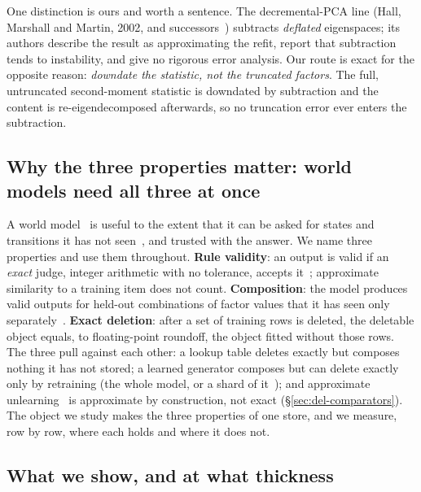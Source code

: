 \documentclass{article} %
\begin{document}
One distinction is ours and worth a sentence. The decremental-PCA line
(Hall, Marshall and Martin, 2002\nocite{hall2002adding}, and successors~\citep{jin2014evd,lee2021fast}) subtracts \emph{deflated} eigenspaces; its
authors describe the result as approximating the refit, report that subtraction tends to
instability, and give no rigorous error analysis. Our route is exact for the opposite reason:
\emph{downdate the statistic, not the truncated factors}. The full, untruncated second-moment
statistic is downdated by subtraction and the content is re-eigendecomposed afterwards, so no
truncation error ever enters the subtraction.

\subsection{Why the three properties matter: world models need all three at once}
\label{sec:why}

A world model~\citep{ha2018world,hafner2025mastering} is useful to the extent that it can be asked for states and transitions it
has not seen~\citep{valevski2025diffusion}, and trusted with the answer. We name three properties and use them throughout.
\textbf{Rule validity}: an output is valid if an \emph{exact} judge, integer arithmetic with
no tolerance, accepts it~\citep{vafa2024evaluating}; approximate similarity to a training item does not count.
\textbf{Composition}: the model produces valid outputs for held-out combinations of factor
values that it has seen only separately~\citep{zhao2022toward}. \textbf{Exact deletion}: after a set of training rows
is deleted, the deletable object equals, to floating-point roundoff, the object fitted without
those rows. The three pull against each other: a lookup table deletes exactly but composes
nothing it has not stored; a learned generator composes but can delete exactly only by retraining
(the whole model, or a shard of it~\citep{bourtoule2021machine}); and
approximate unlearning~\citep{guo2020certified,golatkar2020eternal} is approximate by construction, not exact (\S\ref{sec:del-comparators}).
The object we study makes the three properties of one store, and we measure, row by row, where each
holds and where it does not.

\subsection{What we show, and at what thickness}
\label{sec:contrib}
\end{document}
